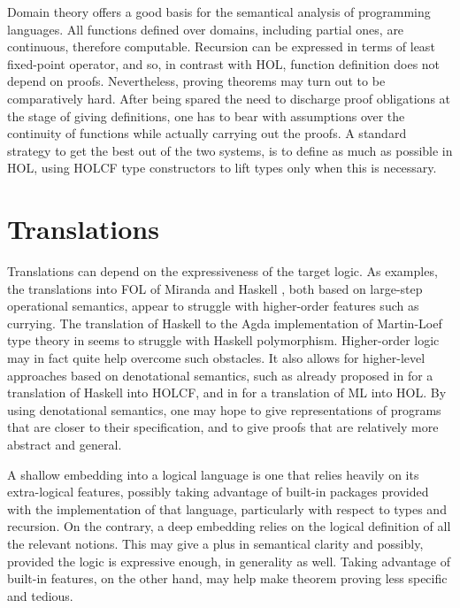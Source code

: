 \documentclass{llncs}
\begin{document}
Domain theory offers a good basis for the semantical analysis of programming
languages. All functions defined over domains, including partial ones, are
continuous, therefore computable.  Recursion can be expressed in terms of
least fixed-point operator, and so, in contrast with HOL, function definition
does not depend on proofs. Nevertheless, proving theorems may turn out to be
comparatively hard.  After being spared the need to discharge proof
obligations at the stage of giving definitions, one has to bear with
assumptions over the continuity of functions while actually carrying out the
proofs. A standard strategy to get the best out of the two systems, is to
define as much as possible in HOL, using HOLCF type constructors to lift types
only when this is necessary.


\section{Translations}
\label{sec:Translations}

Translations can depend on the expressiveness of the target logic. As
examples, the translations into FOL of Miranda
\cite{Thompson95,Thompson89,Thompson95b} and Haskell \cite{Thompson92}, both
based on large-step operational semantics, appear to struggle with
higher-order features such as currying. The translation of Haskell to the Agda
implementation of Martin-Loef type theory in \cite{Abel} seems to struggle
with Haskell polymorphism. Higher-order logic may in fact quite help overcome
such obstacles.  It also allows for higher-level approaches based on
denotational semantics, such as already proposed in \cite{Huff} for a
translation of Haskell into HOLCF, and in \cite{Pollack} for a translation of
ML into HOL. By using denotational semantics, one may hope to give
representations of programs that are closer to their specification, and to
give proofs that are relatively more abstract and general.

A shallow embedding into a logical language is one that relies heavily on its
extra-logical features, possibly taking advantage of built-in packages
provided with the implementation of that language, particularly with respect
to types and recursion. On the contrary, a deep embedding relies on the
logical definition of all the relevant notions. This may give a plus in
semantical clarity and possibly, provided the logic is expressive enough, in
generality as well. Taking advantage of built-in features, on the other hand,
may help make theorem proving less specific and tedious.
\end{document}
